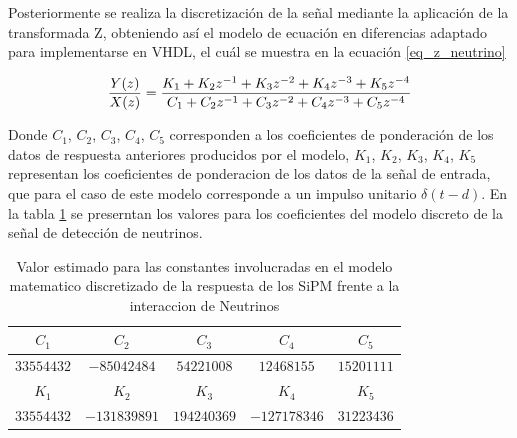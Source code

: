 \documentclass[conference]{IEEEtran}
\begin{document}
Posteriormente se realiza la discretización de la señal mediante la aplicación de la transformada Z, obteniendo así el modelo de ecuación en diferencias adaptado para implementarse en VHDL, el cuál se muestra en la ecuación \ref{eq_z_neutrino}

\begin{equation}
\small
\label{eq_z_neutrino}
\frac{Y(z)}{X(z)}= \dfrac{K_1 + K_2 z^{-1} + K_3 z^{-2} +K_4 z^{-3} +K_5 z^{-4}}{C_1 + C_2 z^{-1} + C_3 z^{-2} +C_4 z^{-3} +C_5 z^{-4}}
\end{equation}

{Donde $C_1$, $C_2$, $C_3$, $C_4$, $C_5$ corresponden a los coeficientes de ponderación de los datos de respuesta anteriores producidos por el modelo, $K_1$, $K_2$, $K_3$, $K_4$, $K_5$ representan los coeficientes de ponderacion de los datos de la señal de entrada, que para el caso de este modelo corresponde a un impulso unitario $\delta(t-d)$. En la tabla \ref{tab_coef_z_neutrino} se preserntan los valores para los coeficientes del modelo discreto de la señal de detección de neutrinos.

\begin{table}[htbp]
\caption{Valor estimado para las constantes involucradas en el modelo matematico discretizado de la respuesta de los SiPM frente a la interaccion de Neutrinos}
\begin{center}
\begin{tabular}{|c|c|c|c|c|}
\hline
$C_1$ & $C_2$ & $C_3$ & $C_4$ & $C_5$ \\
\hline
$33554432$ & $-85042484$ & $54221008$ & $12468155$ & $15201111$ \\
\hline
\hline
$K_1$ & $K_2$ & $K_3$ & $K_4$ & $K_5$ \\
\hline

$33554432$ & $-131839891$ & $194240369$ & $-127178346$ & $31223436$ \\
\hline
\end{tabular}
\label{tab_coef_z_neutrino}
\end{center}
\end{table}

}
\end{document}
